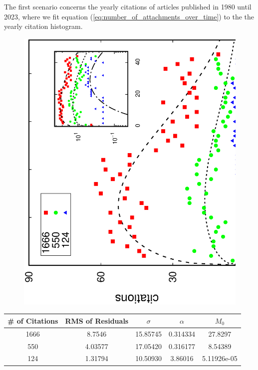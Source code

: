 The first scenario concerns the yearly citations of articles published in 1980 until 2023, where we fit equation (\ref{eq:number_of_attachments_over_time}) to the the yearly citation histogram.

\begin{figure}[H]
    \centering\includegraphics[scale=0.35, angle=270]{figs/citations.eps}
    \caption{}
    \label{fig:citations_fit}
\end{figure}

\begin{table}[H]
\begin{tabular}{|c c c c c|}
\hline
\# of Citations & RMS of Residuals & $\sigma$ & $\alpha$ & $M_{0}$    \\ \hline
1666 & 8.7546 & 15.85745 & 0.314334 & 27.8297 \\ \hline
550 & 4.03577 & 17.05420 & 0.316177 & 8.54389 \\ \hline
124 & 1.31794 & 10.50930 & 3.86016 & 5.11926e-05\\ \hline
\end{tabular}
\end{table}

